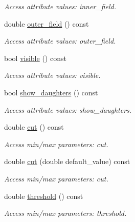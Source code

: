 \begin{DoxyCompactItemize}
\begin{DoxyCompactList}\small\item\em Access attribute values: inner\_\-field. \item\end{DoxyCompactList}\item 
double \hyperlink{struct_d_d4hep_1_1_x_m_l_1_1_dimension_a99c51de131b70daaa0f38ce7c92adcd1}{outer\_\-field} () const 
\begin{DoxyCompactList}\small\item\em Access attribute values: outer\_\-field. \item\end{DoxyCompactList}\item 
bool \hyperlink{struct_d_d4hep_1_1_x_m_l_1_1_dimension_a05778b5b5725a3603ba33dba5dec34cf}{visible} () const 
\begin{DoxyCompactList}\small\item\em Access attribute values: visible. \item\end{DoxyCompactList}\item 
bool \hyperlink{struct_d_d4hep_1_1_x_m_l_1_1_dimension_a9acff89fd8ce3725565bd8e08d39ef55}{show\_\-daughters} () const 
\begin{DoxyCompactList}\small\item\em Access attribute values: show\_\-daughters. \item\end{DoxyCompactList}\item 
double \hyperlink{struct_d_d4hep_1_1_x_m_l_1_1_dimension_ab2a2eb4f9a96cd62c73ace982c917923}{cut} () const 
\begin{DoxyCompactList}\small\item\em Access min/max parameters: cut. \item\end{DoxyCompactList}\item 
double \hyperlink{struct_d_d4hep_1_1_x_m_l_1_1_dimension_ab508a3c27899e395d3034b91f2852948}{cut} (double default\_\-value) const 
\begin{DoxyCompactList}\small\item\em Access min/max parameters: cut. \item\end{DoxyCompactList}\item 
double \hyperlink{struct_d_d4hep_1_1_x_m_l_1_1_dimension_a4a421edac03d2532f8970f335b5d2b6c}{threshold} () const 
\begin{DoxyCompactList}\small\item\em Access min/max parameters: threshold. \item\end{DoxyCompactList}\item 

\end{DoxyCompactItemize}
